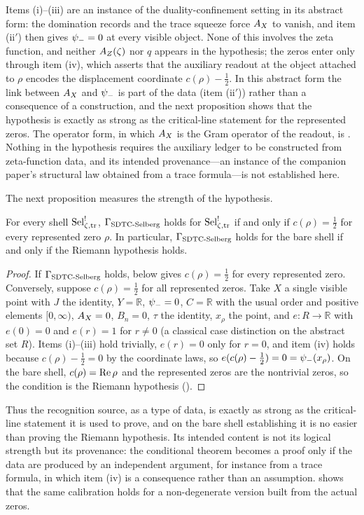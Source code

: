 Items (i)--(iii) are an instance of the duality-confinement setting in
its abstract form: the domination records and the trace squeeze force
\(A_{X}\) to vanish, and item (ii\('\)) then gives \(\psi_{-}=0\) at every visible
object.  None of this involves the zeta function, and neither \(A_{Z}(\zeta)\) nor \(q\)
appears in the hypothesis; the zeros enter only through item (iv), which asserts that the auxiliary readout at the
object attached to \(\rho\) encodes the displacement coordinate
\(c(\rho)-\frac12\).  In this abstract form the link between
\(A_{X}\) and \(\psi_{-}\) is part of the data (item (ii\('\))) rather than a
consequence of a construction, and the next proposition shows that the
hypothesis is exactly as strong as the critical-line statement for the
represented zeros.  The operator form, in which \(A_{X}\) is the Gram
operator of the readout, is .  Nothing in the
hypothesis requires the auxiliary ledger to be constructed from
zeta-function data, and its intended provenance---an instance of the
companion paper's structural law obtained from a trace formula---is
not established here.

The next proposition measures the strength of the hypothesis.

\begin{proposition}
\label{prop:rh:gamma-calibration}
For every shell \(\mathrm{Sel}^{!}_{\zeta,\mathrm{tr}}\), \(\Gamma_{\mathrm{SDTC\text{-}Selberg}}\) holds for \(\mathrm{Sel}^{!}_{\zeta,\mathrm{tr}}\) if and
only if \(c(\rho)=\frac12\) for every represented zero
\(\rho\).  In particular, \(\Gamma_{\mathrm{SDTC\text{-}Selberg}}\) holds for the bare shell if and only
if the Riemann hypothesis holds.
\end{proposition}

\begin{proof}
If \(\Gamma_{\mathrm{SDTC\text{-}Selberg}}\) holds,  below gives
\(c(\rho)=\frac12\) for every represented zero.
Conversely, suppose \(c(\rho)=\frac12\) for all represented
zeros.  Take \(X\) a single visible point with \(J\) the identity,
\(Y=\mathbb R\), \(\psi_{-}=0\), \(C=\mathbb R\) with the usual order and positive elements
\([0,\infty)\),
\(A_{X}=0\), \(B_n=0\), \(\tau\) the identity, \(x_\rho\) the point, and \(e:R\to\mathbb R\) with \(e(0)=0\) and \(e(r)=1\) for \(r\neq0\)
(a classical case distinction on the abstract set \(R\)).  Items (i)--(iii) hold trivially, \(e(r)=0\) only for \(r=0\), and item (iv)
holds because \(c(\rho)-\frac12=0\) by the coordinate
laws, so \(e(c(\rho)-\frac12)=0=\psi_{-}(x_\rho)\).  On the
bare shell, \(c(\rho)=\operatorname{Re}\rho\) and the represented zeros
are the nontrivial zeros, so the condition is the Riemann hypothesis
().
\end{proof}

Thus the recognition source, as a type of data, is exactly as strong as
the critical-line statement it is used to prove, and on the bare shell
establishing it is no easier than proving the Riemann
hypothesis.  Its intended content is not its logical
strength but its provenance: the conditional theorem becomes a proof
only if the data are produced by an independent argument, for instance
from a trace formula, in which item (iv) is a consequence rather than
an assumption.   shows that the same
calibration holds for a non-degenerate version built from the actual
zeros.
